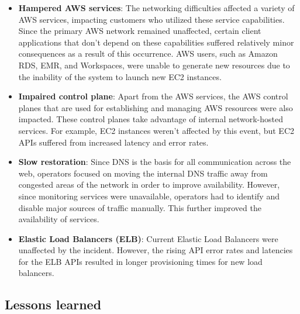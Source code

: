 \begin{itemize}
\item
\protect{}\label{D5hQ16r9z_q1dfFl77X20}
\textbf{Hampered AWS services}: The networking difficulties affected a variety of AWS services, impacting customers who utilized these service capabilities. Since the primary AWS network remained unaffected, certain client applications that don't depend on these capabilities suffered relatively minor consequences as a result of this occurrence. AWS users, such as Amazon RDS, EMR, and Workspaces, were unable to generate new resources due to the inability of the system to launch new EC2 instances.
\item
\protect{}\label{p4WVk6rtxQ3b7otUZ1EpC}
\textbf{Impaired control plane}: Apart from the AWS services, the AWS control planes that are used for establishing and managing AWS resources were also impacted. These control planes take advantage of internal network-hosted services. For example, EC2 instances weren't affected by this event, but EC2 APIs suffered from increased latency and error rates.
\item
\protect{}\label{rkj_HSUVvqjeKr1fYyXu3}
\textbf{Slow restoration}: Since DNS is the basis for all communication across the web, operators focused on moving the internal DNS traffic away from congested areas of the network in order to improve availability. However, since monitoring services were unavailable, operators had to identify and disable major sources of traffic manually. This further improved the availability of services.
\item
\protect{}\label{ogkUiGYHb0hEv4zJLKfuq}
\textbf{Elastic Load Balancers (ELB)}: Current Elastic Load Balancers were unaffected by the incident. However, the rising API error rates and latencies for the ELB APIs resulted in longer provisioning times for new load balancers.
\end{itemize}

\subsection{Lessons learned}\label{hWD5YBlv_q4lx1EDZ6_kz}

